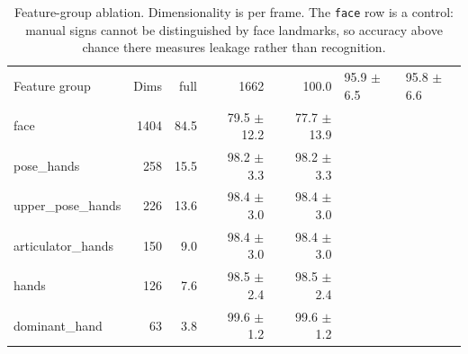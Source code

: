 \begin{table}[t]
\centering
\caption{Feature-group ablation. Dimensionality is per frame. The \texttt{face} row is a control: manual signs cannot be distinguished by face landmarks, so accuracy above chance there measures leakage rather than recognition.}
\label{tab:ablation}
\begin{tabular}{lrrrr}
\toprule
Feature group & Dims & %
\midrule
full & 1662 & 100.0 & 95.9 $\pm$ 6.5 & 95.8 $\pm$ 6.6 \\
face & 1404 & 84.5 & 79.5 $\pm$ 12.2 & 77.7 $\pm$ 13.9 \\
pose\_hands & 258 & 15.5 & 98.2 $\pm$ 3.3 & 98.2 $\pm$ 3.3 \\
upper\_pose\_hands & 226 & 13.6 & 98.4 $\pm$ 3.0 & 98.4 $\pm$ 3.0 \\
articulator\_hands & 150 & 9.0 & 98.4 $\pm$ 3.0 & 98.4 $\pm$ 3.0 \\
hands & 126 & 7.6 & 98.5 $\pm$ 2.4 & 98.5 $\pm$ 2.4 \\
dominant\_hand & 63 & 3.8 & 99.6 $\pm$ 1.2 & 99.6 $\pm$ 1.2 \\
\bottomrule
\end{tabular}
\end{table}
